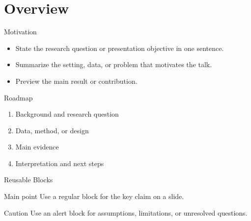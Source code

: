 ﻿\section{Overview}

\begin{frame}{Motivation}
\begin{itemize}
  \item State the research question or presentation objective in one sentence.
  \item Summarize the setting, data, or problem that motivates the talk.
  \item Preview the main result or contribution.
\end{itemize}
\end{frame}

\begin{frame}{Roadmap}
\begin{enumerate}
  \item Background and research question
  \item Data, method, or design
  \item Main evidence
  \item Interpretation and next steps
\end{enumerate}
\end{frame}

\begin{frame}{Reusable Blocks}
\begin{block}{Main point}
Use a regular block for the key claim on a slide.
\end{block}

\begin{alertblock}{Caution}
Use an alert block for assumptions, limitations, or unresolved questions.
\end{alertblock}
\end{frame}

